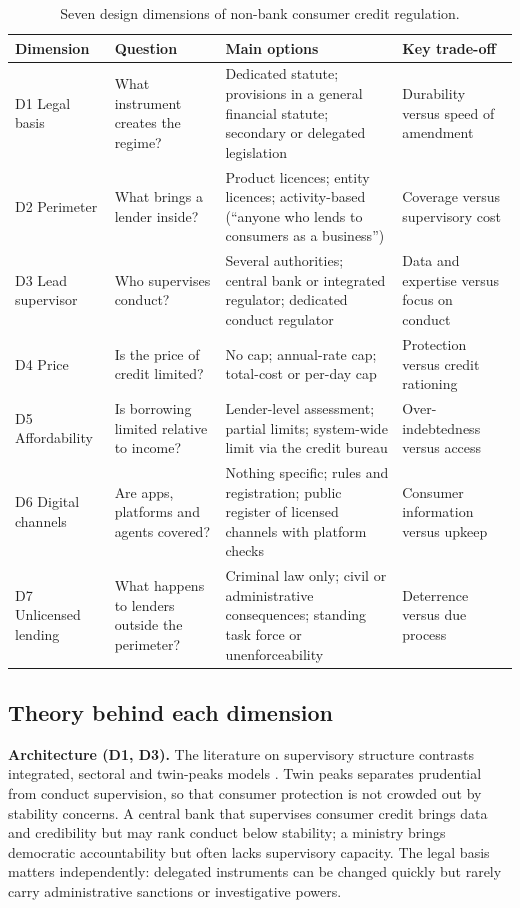 \documentclass[11pt]{article}
\theoremstyle{plain}
\theoremstyle{definition}
\theoremstyle{remark}
\begin{document}
\begin{table}[htbp]
\centering\small
\caption{Seven design dimensions of non-bank consumer credit regulation.}
\label{tab:dimensions}
\begin{tabularx}{\textwidth}{P{2.35cm}P{3.1cm}LP{2.9cm}}
\toprule
Dimension & Question & Main options & Key trade-off \\
\midrule
D1 Legal basis & What instrument creates the regime? & Dedicated statute; provisions in a general financial statute; secondary or delegated legislation & Durability versus speed of amendment \\
D2 Perimeter & What brings a lender inside? & Product licences; entity licences; activity-based (``anyone who lends to consumers as a business'') & Coverage versus supervisory cost \\
D3 Lead supervisor & Who supervises conduct? & Several authorities; central bank or integrated regulator; dedicated conduct regulator & Data and expertise versus focus on conduct \\
D4 Price & Is the price of credit limited? & No cap; annual-rate cap; total-cost or per-day cap & Protection versus credit rationing \\
D5 Affordability & Is borrowing limited relative to income? & Lender-level assessment; partial limits; system-wide limit via the credit bureau & Over-indebtedness versus access \\
D6 Digital channels & Are apps, platforms and agents covered? & Nothing specific; rules and registration; public register of licensed channels with platform checks & Consumer information versus upkeep \\
D7 Unlicensed lending & What happens to lenders outside the perimeter? & Criminal law only; civil or administrative consequences; standing task force or unenforceability & Deterrence versus due process \\
\bottomrule
\end{tabularx}
\end{table}

\subsection{Theory behind each dimension}

\textbf{Architecture (D1, D3).} The literature on supervisory structure contrasts integrated, sectoral and twin-peaks models \citep{Taylor1995,Llewellyn2006}. Twin peaks separates prudential from conduct supervision, so that consumer protection is not crowded out by stability concerns. A central bank that supervises consumer credit brings data and credibility but may rank conduct below stability; a ministry brings democratic accountability but often lacks supervisory capacity. The legal basis matters independently: delegated instruments can be changed quickly but rarely carry administrative sanctions or investigative powers.
\end{document}
